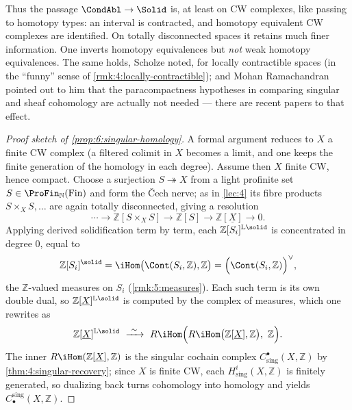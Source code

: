 \begin{remark}
\label{rmk:6:homotopy-types}
Thus the passage $\CondAbl\to\Solid$ is, at least on CW complexes, like passing
to homotopy types: an interval is contracted, and homotopy equivalent CW
complexes are identified. On totally disconnected spaces it retains much finer
information. One inverts homotopy equivalences but \emph{not} weak homotopy
equivalences. The same holds, Scholze noted, for locally contractible spaces (in
the ``funny'' sense of \cref{rmk:4:locally-contractible}); and Mohan Ramachandran
pointed out to him that the paracompactness hypotheses in comparing singular and
sheaf cohomology are actually not needed --- there are recent papers to that
effect.
\end{remark}

\begin{proof}[Proof sketch of \cref{prop:6:singular-homology}]
A formal argument reduces to $X$ a finite CW complex (a filtered colimit in $X$
becomes a limit, and one keeps the finite generation of the homology in each
degree). Assume then $X$ finite CW, hence compact. Choose a surjection
$S\twoheadrightarrow X$ from a light profinite set $S\in\ProFin_{\mathbb{N}}(\mathrm{Fin})$
and form the \v{C}ech nerve; as in \cref{lec:4} its fibre products $S\times_X S,\dots$
are again totally disconnected, giving a resolution
\begin{equation*}
\cdots\to\mathbb{Z}[S\times_{X}S]\to\mathbb{Z}[S]\to\mathbb{Z}[\underline{X}]\to0.
\end{equation*}
Applying derived solidification term by term, each $\mathbb{Z}[S_i]^{\mathbb{L}\solid}$
is concentrated in degree $0$, equal to
\begin{equation*}
\mathbb{Z}[S_i]^{\solid}=\iHom\bigl(\Cont(S_i,\mathbb{Z}),\mathbb{Z}\bigr)
=\Bigl(\Cont(S_i,\mathbb{Z})\Bigr)^{\vee},
\end{equation*}
the $\mathbb{Z}$-valued measures on $S_i$ (\cref{rmk:5:measures}). Each such term
is its own double dual, so $\mathbb{Z}[\underline{X}]^{\mathbb{L}\solid}$ is
computed by the complex of measures, which one rewrites as
\begin{equation*}
\mathbb{Z}[\underline{X}]^{\mathbb{L}\solid}\ \xrightarrow{\ \sim\ }\
R\iHom\Bigl(R\iHom\bigl(\mathbb{Z}[\underline{X}],\mathbb{Z}\bigr),\ \mathbb{Z}\Bigr).
\end{equation*}
The inner $R\iHom(\mathbb{Z}[\underline{X}],\mathbb{Z})$ is the singular cochain
complex $C^{\bullet}_{\mathrm{sing}}(X,\mathbb{Z})$ by
\cref{thm:4:singular-recovery}; since $X$ is finite CW, each
$H^{i}_{\mathrm{sing}}(X,\mathbb{Z})$ is finitely generated, so dualizing back
turns cohomology into homology and yields
$C^{\mathrm{sing}}_{\bullet}(X,\mathbb{Z})$.
\end{proof}

